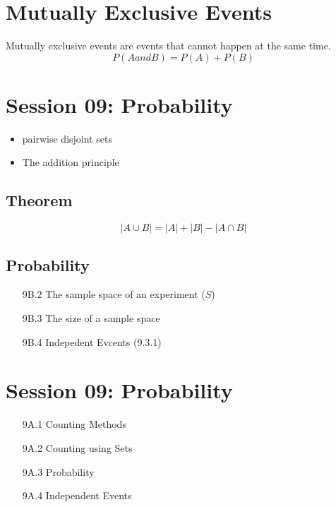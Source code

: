 \documentclass[12pt]{report}
\begin{document}
\section{Mutually Exclusive Events}
Mutually exclusive events are events that cannot happen at the same time.
\[ P(A and B) = P(A) + P(B) \]

\section*{Session 09: Probability}

\begin{itemize}
	\item pairwise disjoint sets
	\item The addition principle
\end{itemize}
\subsection*{Theorem}
\[ |A \cup B| = |A| + |B| - |A \cap B|  \]


\subsection*{Probability}
\begin{itemize}
	\item[9B.2] The sample space of an experiment ($S$)
	\item[9B.3] The size of a sample space
	\item[9B.4] Indepedent Evcents (9.3.1)
\end{itemize}
\section*{Session 09: Probability}
\begin{itemize}
	\item[9A.1] Counting Methods
	\item[9A.2] Counting using Sets
	\item[9A.3] Probability
	\item[9A.4] Independent Events
\end{itemize}
\end{document}
